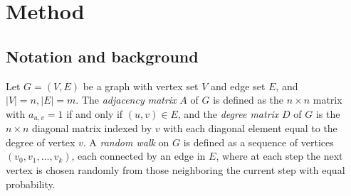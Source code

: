 \documentclass{article} %
\begin{document}







\section{Method}

\subsection{Notation and background}

Let $G = (V,E)$ be a graph with vertex set $V$ and edge set $E$, and $|V| = n, |E| = m$. The \emph{adjacency matrix} $A$ of $G$ is defined as the $n\times n$ matrix with $a_{u,v} = 1$ if and only if $(u,v)\in E$, and the \emph{degree matrix} $D$ of $G$ is the $n \times n$ diagonal matrix indexed by $v$ with each diagonal element equal to the degree of vertex $v$. A \emph{random walk} on $G$ is defined as a sequence of vertices $(v_0,v_1,...,v_k)$, each connected by an edge in $E$, where at each step the next vertex is chosen randomly from those neighboring the current step with equal probability. 
\end{document}
